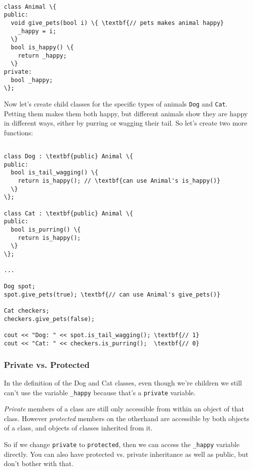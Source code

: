 \documentclass{IEEEtran}
\begin{document}
\begin{Verbatim}[fontsize=\scriptsize, xleftmargin=.3in, commandchars=\\\{\}]

class Animal \{
public:
  void give_pets(bool i) \{ \textbf{// pets makes animal happy}
    _happy = i;
  \}
  bool is_happy() \{
    return _happy;
  \}
private:
  bool _happy;
\};

\end{Verbatim}

Now let's create child classes for the specific types of animals \verb|Dog| and \verb|Cat|. Petting them makes them both happy, but different animals show they are happy in different ways, either by purring or wagging their tail. So let's create two more functions:

\begin{Verbatim}[fontsize=\scriptsize, xleftmargin=.3in, commandchars=\\\{\}]

class Dog : \textbf{public} Animal \{
public:
  bool is_tail_wagging() \{
    return is_happy(); // \textbf{can use Animal's is_happy()}
  \}
\};

class Cat : \textbf{public} Animal \{
public:
  bool is_purring() \{
    return is_happy();
  \}
\};

...

Dog spot;
spot.give_pets(true); \textbf{// can use Animal's give_pets()}

Cat checkers;
checkers.give_pets(false);

cout << "Dog: " << spot.is_tail_wagging(); \textbf{// 1}
cout << "Cat: " << checkers.is_purring();  \textbf{// 0}
\end{Verbatim}


\subsubsection{Private vs. Protected}

In the definition of the Dog and Cat classes, even though we're children we still can't use the variable \verb|_happy| because that's a \verb|private| variable. 

\textit{Private} members of a class are still only accessible from within an object of that class. However \textit{protected} members on the otherhand are accessible by both objects of a class, and objects of classes inherited from it. 

So if we change \verb|private| to \verb|protected|, then we can access the \verb|_happy| variable directly. You can also have protected vs. private inheritance as well as public, but don't bother with that.
\end{document}
